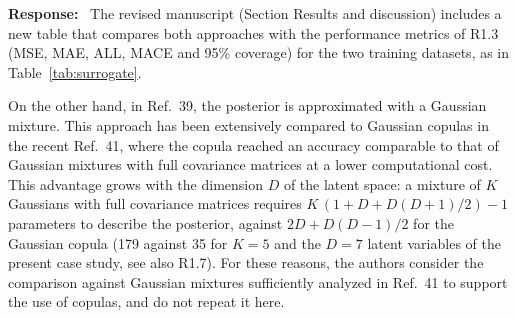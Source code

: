 \documentclass[11pt]{article}
\newenvironment{response}{\par\smallskip\noindent\color{resp}\textbf{Response:}\ }{\par}
\newcommand{\m}{\mathbf{m}}
\newcommand{\z}{\mathbf{z}}
\begin{document}
\begin{response}
	The revised manuscript (Section Results and discussion) includes a new table that compares both approaches with the performance metrics of R1.3 (MSE, MAE, ALL, MACE and 95\% coverage) for the two training datasets, as in Table~\ref{tab:surrogate}.

On the other hand, in Ref.~39, the posterior is approximated with a Gaussian mixture. This approach has been extensively compared to Gaussian copulas in the recent Ref.~41, where the copula reached an accuracy comparable to that of Gaussian mixtures with full covariance matrices at a lower computational cost.	This advantage grows with the dimension $D$ of the latent space: a mixture of $K$ Gaussians with full covariance matrices requires $K\,(1+D+D(D+1)/2)-1$ parameters to describe the posterior, against $2D+D(D-1)/2$ for the Gaussian copula (179 against 35 for $K=5$ and the $D=7$ latent variables of the present case study, see also R1.7).
For these reasons, the authors consider the comparison against Gaussian mixtures sufficiently analyzed in Ref.~41 to support the use of copulas, and do not repeat it here.




\end{response}
\end{document}
